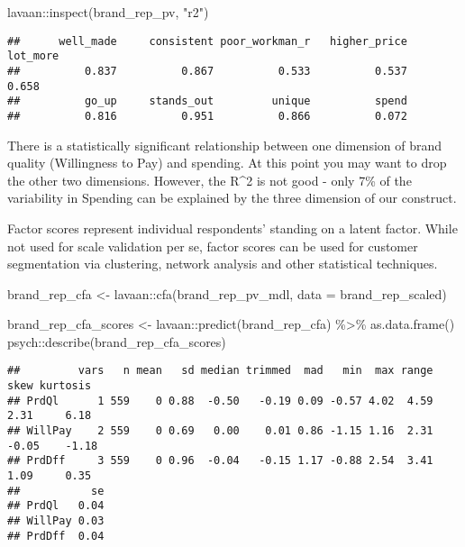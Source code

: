 \documentclass[
]{book}
\newenvironment{Shaded}{\begin{snugshade}}{\end{snugshade}}
\newcommand{\AttributeTok}[1]{\textcolor[rgb]{0.77,0.63,0.00}{#1}}
\newcommand{\FunctionTok}[1]{\textcolor[rgb]{0.00,0.00,0.00}{#1}}
\newcommand{\NormalTok}[1]{#1}
\newcommand{\OtherTok}[1]{\textcolor[rgb]{0.56,0.35,0.01}{#1}}
\newcommand{\SpecialCharTok}[1]{\textcolor[rgb]{0.00,0.00,0.00}{#1}}
\newcommand{\StringTok}[1]{\textcolor[rgb]{0.31,0.60,0.02}{#1}}
\theoremstyle{definition}
\theoremstyle{definition}
\theoremstyle{definition}
\theoremstyle{definition}
\theoremstyle{remark}
\begin{document}
\begin{Shaded}
\begin{Highlighting}[]
\NormalTok{lavaan}\SpecialCharTok{::}\FunctionTok{inspect}\NormalTok{(brand\_rep\_pv, }\StringTok{"r2"}\NormalTok{)}
\end{Highlighting}
\end{Shaded}

\begin{verbatim}
##      well_made     consistent poor_workman_r   higher_price       lot_more 
##          0.837          0.867          0.533          0.537          0.658 
##          go_up     stands_out         unique          spend 
##          0.816          0.951          0.866          0.072
\end{verbatim}

There is a statistically significant relationship between one dimension of brand quality (Willingness to Pay) and spending. At this point you may want to drop the other two dimensions. However, the R\^{}2 is not good - only 7\% of the variability in Spending can be explained by the three dimension of our construct.

Factor scores represent individual respondents' standing on a latent factor. While not used for scale validation per se, factor scores can be used for customer segmentation via clustering, network analysis and other statistical techniques.

\begin{Shaded}
\begin{Highlighting}[]
\NormalTok{brand\_rep\_cfa }\OtherTok{\textless{}{-}}\NormalTok{ lavaan}\SpecialCharTok{::}\FunctionTok{cfa}\NormalTok{(brand\_rep\_pv\_mdl, }\AttributeTok{data =}\NormalTok{ brand\_rep\_scaled)}

\NormalTok{brand\_rep\_cfa\_scores }\OtherTok{\textless{}{-}}\NormalTok{ lavaan}\SpecialCharTok{::}\FunctionTok{predict}\NormalTok{(brand\_rep\_cfa) }\SpecialCharTok{\%\textgreater{}\%} \FunctionTok{as.data.frame}\NormalTok{()}
\NormalTok{psych}\SpecialCharTok{::}\FunctionTok{describe}\NormalTok{(brand\_rep\_cfa\_scores)}
\end{Highlighting}
\end{Shaded}

\begin{verbatim}
##         vars   n mean   sd median trimmed  mad   min  max range  skew kurtosis
## PrdQl      1 559    0 0.88  -0.50   -0.19 0.09 -0.57 4.02  4.59  2.31     6.18
## WillPay    2 559    0 0.69   0.00    0.01 0.86 -1.15 1.16  2.31 -0.05    -1.18
## PrdDff     3 559    0 0.96  -0.04   -0.15 1.17 -0.88 2.54  3.41  1.09     0.35
##           se
## PrdQl   0.04
## WillPay 0.03
## PrdDff  0.04
\end{verbatim}
\end{document}
